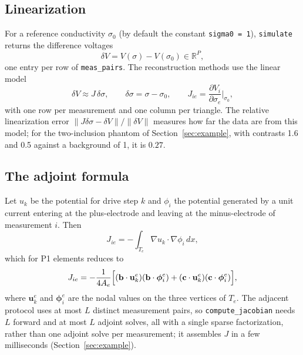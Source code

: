 \documentclass[11pt,a4paper]{article}
\newcommand{\code}[1]{\texttt{#1}}
\newcommand{\dsig}{\delta\sigma}
\newcommand{\dV}{\delta V}
\begin{document}
\subsection{Linearization}

For a reference conductivity $\sigma_0$ (by default the constant
\code{sigma0 = 1}), \code{simulate} returns the difference voltages
\begin{equation}
  \dV = V(\sigma) - V(\sigma_0) \in\mathbb R^{P},
\end{equation}
one entry per row of \code{meas\_pairs}. The reconstruction methods use the
linear model
\begin{equation}\label{eq:linear}
  \dV \approx J\,\dsig, \qquad \dsig = \sigma-\sigma_0 ,\qquad
  J_{ie} = \frac{\partial V_i}{\partial\sigma_e}\Big|_{\sigma_0} ,
\end{equation}
with one row per measurement and one column per triangle. The relative
linearization error $\|J\dsig-\dV\|/\|\dV\|$ measures how far the data are
from this model; for the two-inclusion phantom of
Section~\ref{sec:example}, with contrasts 1.6 and 0.5 against a background of
1, it is $0.27$.

\subsection{The adjoint formula}

Let $u_k$ be the potential for drive step $k$ and $\phi_i$ the potential
generated by a unit current entering at the plus-electrode and leaving at the
minus-electrode of measurement $i$. Then~\cite{Geselowitz1971}
\begin{equation}\label{eq:sensitivity}
  J_{ie} = -\int_{T_e}\nabla u_k\cdot\nabla\phi_i\,dx ,
\end{equation}
which for P1 elements reduces to
\begin{equation}
  J_{ie} = -\frac{1}{4A_e}\Bigl[(\mathbf b\cdot\mathbf u_k^e)
  (\mathbf b\cdot\boldsymbol\phi_i^e) + (\mathbf c\cdot\mathbf u_k^e)
  (\mathbf c\cdot\boldsymbol\phi_i^e)\Bigr],
\end{equation}
where $\mathbf u_k^e$ and $\boldsymbol\phi_i^e$ are the nodal values on the
three vertices of $T_e$. The adjacent protocol uses at most $L$ distinct
measurement pairs, so \code{compute\_jacobian} needs $L$ forward and at most
$L$ adjoint solves, all with a single sparse factorization, rather than one
adjoint solve per measurement; it assembles $J$ in a few milliseconds
(Section~\ref{sec:example}).
\end{document}
